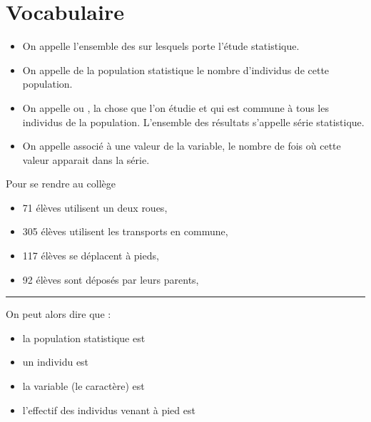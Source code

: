 \section{Vocabulaire}

\begin{definitionbox}
\begin{itemize}[label=\textbullet]
    \item On appelle  l'ensemble 
        des  sur lesquels porte l'étude statistique. 
    \item On appelle  de la population statistique le
        nombre d'individus de cette population. 
    \item On appelle  ou , la chose que l'on étudie
        et qui est commune à tous les individus de la population. L'ensemble des
        résultats s'appelle série statistique.
    \item On appelle  associé à une valeur de la variable, le nombre de
        fois où cette valeur apparait dans la série.
\end{itemize}
\end{definitionbox}

\begin{exemplebox}
    Pour se rendre au collège

    \begin{itemize}[label=\textbullet]
        \item 71 élèves utilisent un deux roues,
        \item 305 élèves utilisent les transports en commune,
        \item 117 élèves se déplacent à pieds,
        \item 92 élèves sont déposés par leurs parents,
    \end{itemize}
    \begin{center}\rule{0.7\textwidth}{0.2pt}\end{center}
    On peut alors dire que :
    \begin{itemize}[label=\textbullet]
        \item la population statistique est 
        \item un individu est 
        \item la variable (le caractère) est 
        \item l'effectif des individus venant à pied est 
    \end{itemize}

\end{exemplebox}

